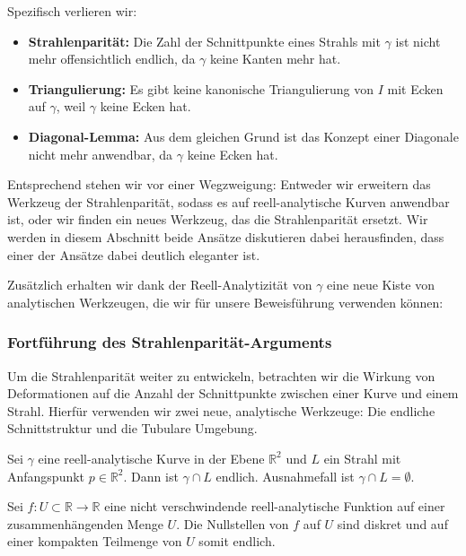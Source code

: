 Spezifisch verlieren wir:

\begin{itemize}
    \item \textbf{Strahlenparität:} Die Zahl der Schnittpunkte eines Strahls mit $\gamma$ ist nicht mehr offensichtlich endlich, da $\gamma$ keine Kanten mehr hat. 
    \item \textbf{Triangulierung:} Es gibt keine kanonische Triangulierung von $I$ mit Ecken auf $\gamma$, weil $\gamma$ keine Ecken hat. 
    \item \textbf{Diagonal-Lemma:} Aus dem gleichen Grund ist das Konzept einer Diagonale nicht mehr anwendbar, da $\gamma$ keine Ecken hat.
\end{itemize}

Entsprechend stehen wir vor einer Wegzweigung: Entweder wir erweitern das Werkzeug der Strahlenparität, sodass es auf reell-analytische Kurven anwendbar ist, oder wir finden ein neues Werkzeug, das die Strahlenparität ersetzt. 
Wir werden in diesem Abschnitt beide Ansätze diskutieren dabei herausfinden, dass einer der Ansätze dabei deutlich eleganter ist. 

Zusätzlich erhalten wir dank der Reell-Analytizität von $\gamma$ eine neue Kiste von analytischen Werkzeugen, die wir für unsere Beweisführung verwenden können:

\subsubsection{Fortführung des Strahlenparität-Arguments}

Um die Strahlenparität weiter zu entwickeln, betrachten wir die Wirkung von Deformationen auf die Anzahl der Schnittpunkte zwischen einer Kurve und einem Strahl. 
Hierfür verwenden wir zwei neue, analytische Werkzeuge: Die endliche Schnittstruktur und die Tubulare Umgebung. 

\begin{satz}
    Sei $\gamma$ eine reell-analytische Kurve in der Ebene $\mathbb{R}^2$ und $L$ ein Strahl mit Anfangspunkt $p \in \mathbb{R}^2$.
    Dann ist $\gamma \cap L$ endlich. Ausnahmefall ist $\gamma \cap L = \emptyset$.
\end{satz}

\begin{satz}
    Sei $f: U \subset \mathbb{R} \to \mathbb{R}$ eine nicht verschwindende reell-analytische Funktion auf einer zusammenhängenden Menge $U$.
    Die Nullstellen von $f$ auf $U$ sind diskret und auf einer kompakten Teilmenge von $U$ somit endlich.
\end{satz}

